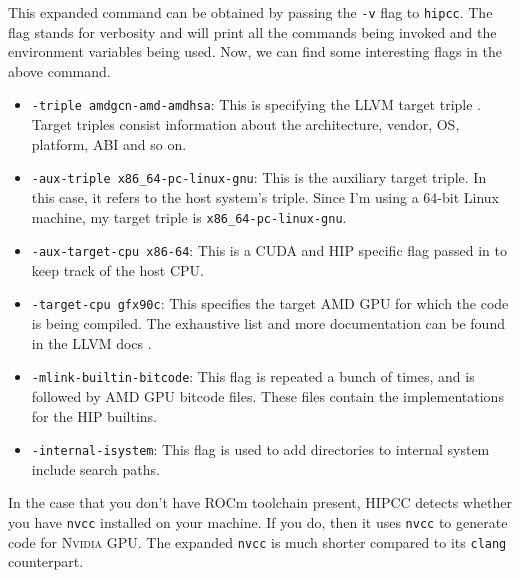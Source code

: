 \documentclass{btp}
\begin{document}
This expanded command can be obtained by passing the \texttt{-v} flag to \texttt{hipcc}. The flag stands for verbosity and will print all the commands being invoked and the environment variables being used. Now, we can find some interesting flags in the above command.

\begin{itemize}
	\item \texttt{-triple amdgcn-amd-amdhsa}: This is specifying the LLVM target triple \cite{triple}. Target triples consist information about the architecture, vendor, OS, platform, ABI and so on.
	\item \texttt{-aux-triple x86\_64-pc-linux-gnu}: This is the auxiliary target triple. In this case, it refers to the host system's triple. Since I'm using a 64-bit Linux machine, my target triple is \texttt{x86\_64-pc-linux-gnu}.
	\item \texttt{-aux-target-cpu x86-64}: This is a CUDA and HIP specific flag passed in to keep track of the host CPU.
	\item \texttt{-target-cpu gfx90c}: This specifies the target AMD GPU for which the code is being compiled. The exhaustive list and more documentation can be found in the LLVM docs \cite{llvm-amd-docs}.
	\item \texttt{-mlink-builtin-bitcode}: This flag is repeated a bunch of times, and is followed by AMD GPU bitcode files. These files contain the implementations for the HIP builtins.
	\item \texttt{-internal-isystem}: This flag is used to add directories to internal system include search paths.
\end{itemize}

In the case that you don't have ROCm toolchain present, HIPCC detects whether you have \texttt{nvcc} installed on your machine. If you do, then it uses \texttt{nvcc} to generate code for \textsc{Nvidia} GPU. The expanded \texttt{nvcc} is much shorter compared to its \texttt{clang} counterpart.
\end{document}
